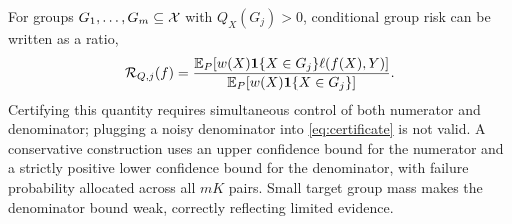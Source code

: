 For groups $G_1,\ldots,G_m\subseteq\mathcal{X}$ with $Q_X(G_j)>0$, conditional group risk
can be written as a ratio,
\begin{equation}
  \mathcal{R}_{Q,j}(f)=
  \frac{\mathbb{E}_P[w(X)\mathbf{1}\{X\in G_j\}\ell(f(X),Y)]}
       {\mathbb{E}_P[w(X)\mathbf{1}\{X\in G_j\}]}.
\end{equation}
Certifying this quantity requires simultaneous control of both numerator and
denominator; plugging a noisy denominator into \cref{eq:certificate} is not valid.
A conservative construction uses an upper confidence bound for the numerator and a
strictly positive lower confidence bound for the denominator, with failure
probability allocated across all $mK$ pairs.  Small target group mass makes the
denominator bound weak, correctly reflecting limited evidence.
